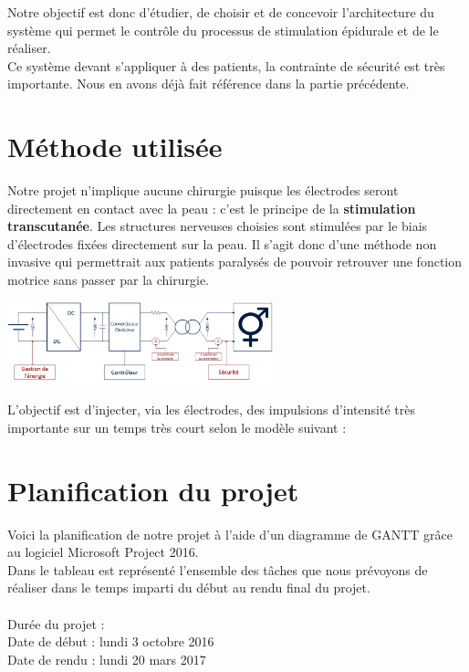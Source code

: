 \documentclass{report}
\begin{document}
Notre objectif est donc d'\'{e}tudier, de choisir et de concevoir l'architecture du syst\`{e}me qui
permet le contrôle du processus de stimulation \'{e}pidurale et de le r\'{e}aliser.\\
Ce syst\`{e}me devant s'appliquer \`{a} des patients, la contrainte de s\'{e}curit\'{e} est tr\`{e}s importante.
Nous en avons d\'{e}j\`{a} fait r\'{e}f\'{e}rence dans la partie pr\'{e}c\'{e}dente.
    
\section{M\'{e}thode utilis\'{e}e}

Notre projet n’implique aucune chirurgie puisque les \'{e}lectrodes seront directement en
contact avec la peau : c’est le principe de la \textbf{stimulation transcutan\'{e}e}. Les structures
nerveuses choisies sont stimul\'{e}es par le biais d'\'{e}lectrodes fix\'{e}es directement sur la peau. Il
s'agit donc d’une m\'{e}thode non invasive qui permettrait aux patients paralys\'{e}s de pouvoir
retrouver une fonction motrice sans passer par la chirurgie. \\

\begin{center}
 \includegraphics[height=90]{./Schema/sch_proj_modifie.jpg}
\end{center}

L’objectif est d’injecter, via les \'{e}lectrodes, des impulsions d’intensit\'{e} tr\`{e}s importante sur un
temps tr\`{e}s court selon le mod\`{e}le suivant : \\



\section{Planification du projet}

Voici la planification de notre projet \`{a} l’aide d’un diagramme de GANTT gr\^{a}ce au logiciel
Microsoft Project 2016.\\
Dans le tableau est repr\'{e}sent\'{e} l’ensemble des t\^{a}ches que nous pr\'{e}voyons de r\'{e}aliser dans le
temps imparti du d\'{e}but au rendu final du projet.\\ \\
Dur\'{e}e du projet : \\
Date de d\'{e}but : lundi 3 octobre 2016 \\
Date de rendu : lundi 20 mars 2017
\end{document}
